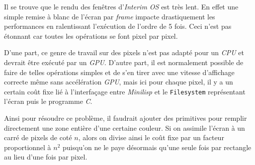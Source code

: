 \documentclass[a4paper, 10pt, french]{article}
\newcommand{\codeC}[1]{\texttt{#1}}
\newcommand{\foreign}[1]{\emph{#1}}
\begin{document}
Il se trouve que le rendu des fenêtres d'\foreign{Interim OS} est très lent. En effet une simple remise à blanc de l'écran par \foreign{frame} impacte drastiquement les performances en ralentissant l'exécution de l'ordre de 5 fois. Ceci n'est pas étonnant car toutes les opérations se font pixel par pixel. 

D'une part, ce genre de travail sur des pixels n'est pas adapté pour un \foreign{CPU} et devrait être exécuté par un \foreign{GPU}. D'autre part, il est normalement possible de faire de telles opérations simples et de s'en tirer avec une vitesse d'affichage correcte même sans accélération \foreign{GPU}, mais ici pour chaque pixel, il y a un certain coût fixe lié à l'interfaçage entre \foreign{Minilisp} et le \codeC{Filesystem} représentant l'écran puis le programme \foreign{C}. 

Ainsi pour résoudre ce problème, il faudrait ajouter des primitives pour remplir directement une zone entière d'une certaine couleur. Si on assimile l'écran à un carré de pixels de coté $n$, alors on divise ainsi le coût fixe par un facteur proportionnel à $n^2$ puisqu'on ne le paye désormais qu'une seule fois par rectangle au lieu d'une fois par pixel.
\end{document}
